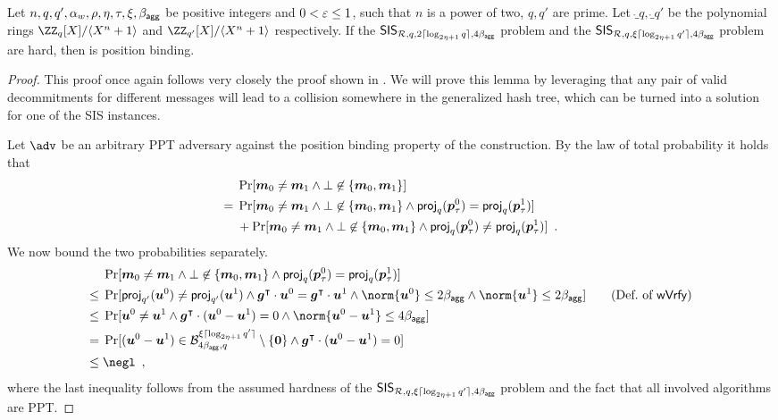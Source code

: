 \begin{lemma}\label{lem:hvcposbind}
  Let $n,q,q',\alpha_w,\rho,\eta,\tau,\xi,\beta_{\mathsf{agg}}$ be positive integers and $0 < \varepsilon \leq 1$, such that $n$ is a power of two, $q,q'$ are prime.
  Let $\ring_q,\ring_{q'}$ be the polynomial rings $\defringq$ and $\defringqq$ respectively.
  If the $\mathsf{SIS}_{\mathcal{R},q,2\lceil \log_{2\eta+1} q \rceil,4\beta_{\mathsf{agg}}}$ problem and the $\mathsf{SIS}_{\mathcal{R},q,\xi\lceil \log_{2\eta+1} q' \rceil,4\beta_{\mathsf{agg}}}$ problem are hard, then \eprint{$\hvcplain$}\cameraready{$\hvccamera$} is position binding.
\end{lemma}
\begin{proof}
This proof once again follows very closely the proof shown in \cite{CCS:FleSimZha22}.
We will prove this lemma by leveraging that any pair of valid decommitments for different messages will lead to a collision somewhere in the generalized hash tree, which can be turned into a solution for one of the SIS instances. 

  Let $\adv$ be an arbitrary PPT adversary against the position binding property of the construction.
%  
  By the law of total probability it holds that
  \begin{align*}
    &\Pr[\boldsymbol{m}_0\neq \boldsymbol{m}_1 \land \bot\not\in\{\boldsymbol{m}_0,\boldsymbol{m}_1\}]\\
    ={}& \Pr[\boldsymbol{m}_0\neq \boldsymbol{m}_1 \land \bot\not\in\{\boldsymbol{m}_0,\boldsymbol{m}_1\} \land \mathsf{proj}_{q}(\boldsymbol{p}_\tau^0) = \mathsf{proj}_{q}(\boldsymbol{p}_\tau^1)]\\& 
    +
    \Pr[\boldsymbol{m}_0\neq \boldsymbol{m}_1 \land \bot\not\in\{\boldsymbol{m}_0,\boldsymbol{m}_1\} \land \mathsf{proj}_{q}(\boldsymbol{p}_\tau^0) \neq \mathsf{proj}_{q}(\boldsymbol{p}_\tau^1)]\enspace.
  \end{align*}
%
  We now bound the two probabilities separately.
%  
  \begin{align*}
    &\Pr[\vec{m}_0\neq \vec{m}_1 \land \bot\not\in\{\vec{m}_0,\vec{m}_1\} \land \projmod{q}(\vec{p}_\tau^0) = \projmod{q}(\vec{p}_\tau^1)]\\
    \leq{}&\Pr[\projmod{q'}(\vec{u}^0) \neq \projmod{q'}(\vec{u}^1) \land \vec{g}^\transpose\cdot \vec{u}^0 = \vec{g}^\transpose\cdot \vec{u}^1 \land \norm{\vec{u}^0}\leq 2\bagg \land \norm{\vec{u}^1}\leq 2\bagg]\tag{Def.\ of $\wverify$}\\
    \leq{}& \Pr[\vec{u}^0 \neq \vec{u}^1 \land \vec{g}^\transpose\cdot (\vec{u}^0-\vec{u}^1) = 0 \land \norm{\vec{u}^0-\vec{u}^1}\leq 4\bagg]\\
    = {}& \Pr[(\vec{u}^0-\vec{u}^1) \in \ball{4\bagg}{q}^{\xi\normalceil{\log_{2\eta+1}q'}}\setminus \{\vec{0}\} \land \vec{g}^\transpose\cdot (\vec{u}^0-\vec{u}^1) = 0]\\
    \leq{}& \negl\enspace,
  \end{align*}
  where the last inequality follows from the assumed hardness of the $\mathsf{SIS}_{\mathcal{R},q,\xi\lceil \log_{2\eta+1} q' \rceil,4\beta_{\mathsf{agg}}}$ problem and the fact that all involved algorithms are PPT.
  

\end{proof}

